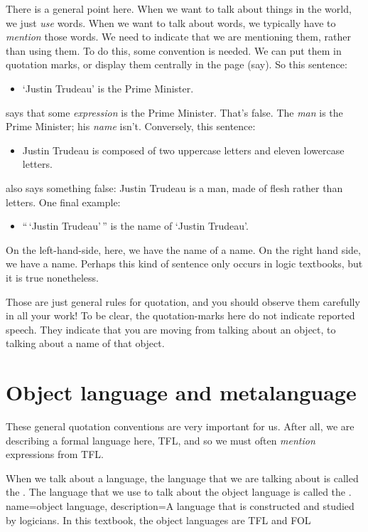 There is a general point here. When we want to talk about things in the world, we just \emph{use} words. When we want to talk about words, we typically have to \emph{mention} those words. We need to indicate that we are mentioning them, rather than using them. To do this, some convention is needed. We can put them in quotation marks, or display them centrally in the page (say). So this sentence:
\begin{itemize}
	\item `Justin Trudeau' is the Prime Minister.
\end{itemize}
says that some \emph{expression} is the Prime Minister. That's false. The \emph{man} is the Prime Minister; his \emph{name} isn't. Conversely, this sentence:
\begin{itemize}
	\item Justin Trudeau is composed of two uppercase letters and eleven lowercase letters.
\end{itemize}
also says something false: Justin Trudeau is a man, made of flesh rather than letters. One final example:
\begin{itemize}
	\item ``\,`Justin Trudeau'\,'' is the name of `Justin Trudeau'.
\end{itemize}
On the left-hand-side, here, we have the name of a name. On the right hand side, we have a name. Perhaps this kind of sentence only occurs in logic textbooks, but it is true nonetheless.

Those are just general rules for quotation, and you should observe them carefully in all your work! To be clear, the quotation-marks here do not indicate reported speech. They indicate that you are moving from talking about an object, to talking about a name of that object.



\section{Object language and metalanguage}
These general quotation conventions are very important for us. After all, we are describing a formal language here, TFL, and so we must often \emph{mention} expressions from TFL.

When we talk about a language, the language that we are talking about is called the . The language that we use to talk about the object language is called the .
\label{def:metalanguage}
{
	name=object language,
	description={A language that is constructed and studied by logicians. In this textbook,
		the object languages are TFL and FOL}
}

